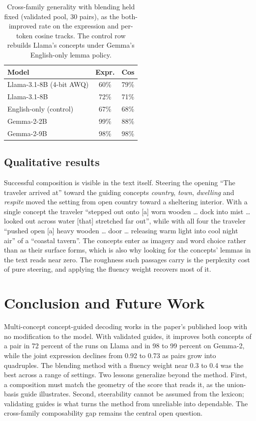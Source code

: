 \documentclass[a4paper,10pt,twocolumn]{article}
\begin{document}
 \begin{table}[t]
  \centering
  \small
  \setlength{\tabcolsep}{4pt}
  \caption{Cross-family generality with blending held fixed (validated pool,
  30 pairs), as the both-improved rate on the expression and per-token cosine
  tracks. The control row rebuilds Llama's concepts under Gemma's English-only
  lemma policy.}
  \label{tab:crossmodel}
  \begin{tabular}{lcc}
  \toprule
  Model & Expr. & Cos\\
  \midrule
  Llama-3.1-8B (4-bit AWQ)     & 60\% & 79\%\\
  Llama-3.1-8B                 & 72\% & 71\%\\
  \quad English-only (control) & 67\% & 68\%\\
  Gemma-2-2B                 & 99\% & 88\%\\
  Gemma-2-9B                 & 98\% & 98\%\\
  \bottomrule
  \end{tabular}
  \end{table}

\subsection{Qualitative results}
Successful composition is visible in the text itself. Steering the opening
``The traveler arrived at'' toward the guiding concepts \emph{country},
\emph{town}, \emph{dwelling} and \emph{respite} moved the setting from open
country toward a sheltering interior. With a single concept the traveler ``stepped out onto [a] worn wooden \dots{} dock into mist \dots{} looked out across water [that] stretched far out'', while with all four the traveler ``pushed open [a] heavy wooden \dots{} door \dots{} releasing warm light into cool night air'' of a ``coastal tavern''. The concepts enter as imagery and word choice rather than as their surface forms, which is also why looking for the concepts' lemmas in the text reads near zero. The roughness such passages carry is the perplexity cost of pure steering, and applying the fluency weight recovers most of it.

\section{Conclusion and Future Work}

Multi-concept concept-guided decoding works in the paper's published loop with no modification to the model. With validated guides, it improves both concepts of a pair in 72 percent of the runs on Llama and in 98 to 99 percent on Gemma-2, while the joint expression declines from 0.92 to 0.73 as pairs grow into quadruples. The blending method with a fluency weight near 0.3 to 0.4 was the best across a range of settings. Two lessons generalize beyond the method. First, a composition must match the geometry of the score that reads it, as the union-basis guide illustrates. Second, steerability cannot be assumed from the lexicon; validating guides is what turns the method from unreliable into dependable. The cross-family composability gap remains the central open question.
\end{document}
